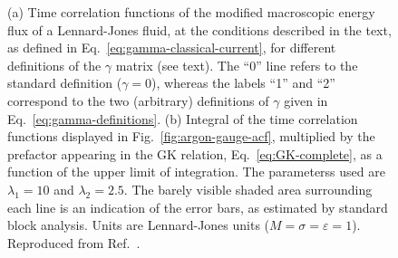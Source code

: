\begin{figure}
    \begin{center}
    \end{center}
	\caption{(a) Time correlation functions of the modified macroscopic energy flux of a Lennard-Jones fluid, at the conditions described in the text, as defined in Eq.~\eqref{eq:gamma-classical-current}, for different definitions of the $\gamma$ matrix (see text). The ``0'' line refers to the standard definition ($\gamma = 0$), whereas the labels ``1'' and ``2'' correspond to the two (arbitrary) definitions of $\gamma$ given in Eq.~\eqref{eq:gamma-definitions}.
    (b) Integral of the time correlation functions displayed in Fig.~\ref{fig:argon-gauge-acf}, multiplied by the prefactor appearing in the GK relation, Eq.~\eqref{eq:GK-complete}, as a function of the upper limit of integration. 
    The parameterss used are $\lambda_1=10$ and $\lambda_2=2.5$. The barely visible shaded area surrounding each line is an indication of the error bars, as estimated by standard block analysis. Units are Lennard-Jones units ($M=\sigma=\varepsilon=1$). Reproduced from Ref.~\cite{Ercole2016}. 
    }
    \label{fig:argon-gauge}
\end{figure}

